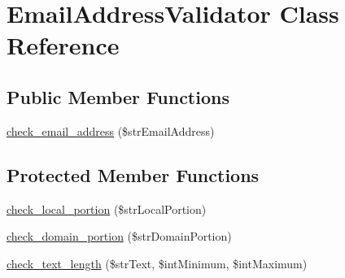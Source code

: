 \hypertarget{class_email_address_validator}{
\section{EmailAddressValidator Class Reference}
\label{class_email_address_validator}
}
\subsection*{Public Member Functions}
\begin{DoxyCompactItemize}
\item 
\hyperlink{class_email_address_validator_a11a8f25060bdf13ebd328348908c5a98}{check\_\-email\_\-address} (\$strEmailAddress)
\end{DoxyCompactItemize}
\subsection*{Protected Member Functions}
\begin{DoxyCompactItemize}
\item 
\hyperlink{class_email_address_validator_a22def614d48f871a76ecffca29160c75}{check\_\-local\_\-portion} (\$strLocalPortion)
\item 
\hyperlink{class_email_address_validator_a032db7f665ed820cf64d28928a447e1b}{check\_\-domain\_\-portion} (\$strDomainPortion)
\item 
\hyperlink{class_email_address_validator_a2ec24ae7cc62a5e99f43d8fbf5562217}{check\_\-text\_\-length} (\$strText, \$intMinimum, \$intMaximum)
\end{DoxyCompactItemize}


